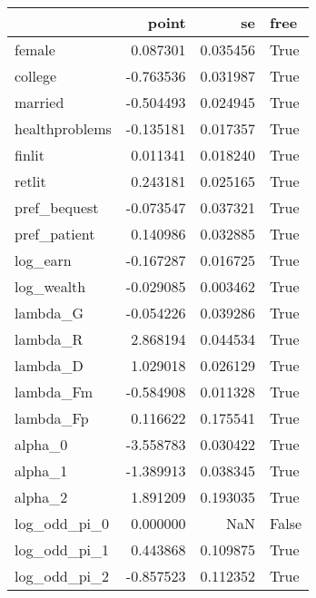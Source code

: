 \begin{tabular}{lrrl}
\toprule
{} &     point &        se &   free \\
\midrule
female         &  0.087301 &  0.035456 &   True \\
college        & -0.763536 &  0.031987 &   True \\
married        & -0.504493 &  0.024945 &   True \\
healthproblems & -0.135181 &  0.017357 &   True \\
finlit         &  0.011341 &  0.018240 &   True \\
retlit         &  0.243181 &  0.025165 &   True \\
pref\_bequest   & -0.073547 &  0.037321 &   True \\
pref\_patient   &  0.140986 &  0.032885 &   True \\
log\_earn       & -0.167287 &  0.016725 &   True \\
log\_wealth     & -0.029085 &  0.003462 &   True \\
lambda\_G       & -0.054226 &  0.039286 &   True \\
lambda\_R       &  2.868194 &  0.044534 &   True \\
lambda\_D       &  1.029018 &  0.026129 &   True \\
lambda\_Fm      & -0.584908 &  0.011328 &   True \\
lambda\_Fp      &  0.116622 &  0.175541 &   True \\
alpha\_0        & -3.558783 &  0.030422 &   True \\
alpha\_1        & -1.389913 &  0.038345 &   True \\
alpha\_2        &  1.891209 &  0.193035 &   True \\
log\_odd\_pi\_0   &  0.000000 &       NaN &  False \\
log\_odd\_pi\_1   &  0.443868 &  0.109875 &   True \\
log\_odd\_pi\_2   & -0.857523 &  0.112352 &   True \\
\bottomrule
\end{tabular}
